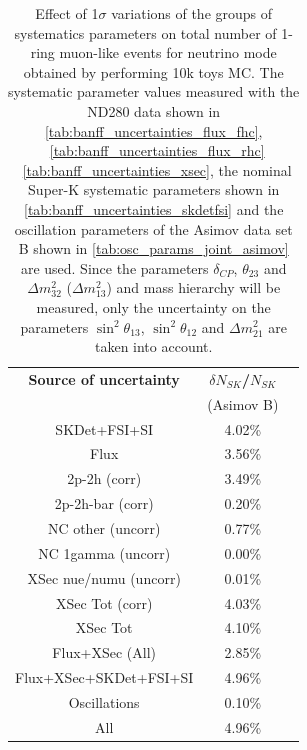 


\begin{table}[htb]
\centering
\begin{tabular}{| c | c | c |}
\hline
  {\bf Source of uncertainty}    & \multicolumn{1}{c|}{{\bf ${\delta}N_{SK}$/$N_{SK}$}}\\
                                 & \multicolumn{1}{c|}{(Asimov B)}\\

\hline
\hline  SKDet+FSI+SI                   & 4.02\%                        \\
\hline
  Flux                           & 3.56\%                        \\
\hline
\hline
  2p-2h (corr)                     & 3.49\%                        \\
  2p-2h-bar (corr)                  & 0.20\%                        \\
  NC other (uncorr)              & 0.77\%                        \\
  NC 1gamma (uncorr)             & 0.00\%                        \\
  XSec nue/numu (uncorr)                 & 0.01\%                        \\
\hline  
  XSec Tot (corr)                  & 4.03\%                        \\
  XSec Tot                       & 4.10\%                        \\
\hline
\hline
  Flux+XSec (All)                      & 2.85\%                        \\
\hline
  Flux+XSec+SKDet+FSI+SI         & 4.96\%                        \\
\hline
\hline
  Oscillations                   & 0.10\%                        \\
\hline
\hline
  All                            & 4.96\%                        \\
\hline
\hline

\end{tabular}
\caption{
 Effect of 1$\sigma$ variations of the groups of systematics parameters on total number of
 1-ring muon-like events for neutrino mode obtained by performing 10k toys MC.
The systematic parameter values measured with the ND280 data 
shown in 
\cref{tab:banff_uncertainties_flux_fhc},
~\ref{tab:banff_uncertainties_flux_rhc}
~\ref{tab:banff_uncertainties_xsec},
the nominal Super-K systematic parameters shown in \cref{tab:banff_uncertainties_skdetfsi}
and the oscillation parameters of the Asimov data set B shown in \cref{tab:osc_params_joint_asimov}
are used.
Since the parameters $\delta_{CP}$, $\theta_{23}$ and $\Delta m^2_{32}$ ($\Delta m^2_{13}$) and mass hierarchy
will be measured,
only the uncertainty on the parameters 
$\sin^2 \theta_{13}$,
$\sin^2 \theta_{12}$
and 
$\Delta m^2_{21}$ 
are taken into account.
}                                                                                                                                                                                          
\label{tab:nsk_systematic_table_summary_joint_asimov_B_fhc_mulike}
\end{table}




